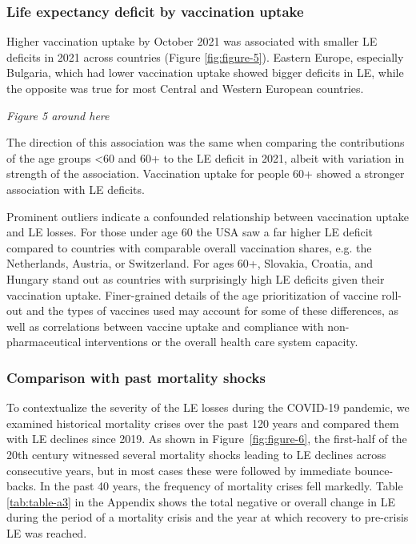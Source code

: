 \documentclass[12pt]{article}
\begin{document}
\subsubsection*{Life expectancy deficit by vaccination uptake}

Higher vaccination uptake by October 2021 was associated with smaller LE deficits in 2021 across countries (Figure \ref{fig:figure-5}). Eastern Europe, especially Bulgaria, which had lower vaccination uptake showed bigger deficits in LE, while the opposite was true for most Central and Western European countries.

\par\medskip
\emph{Figure 5 around here}
\par\medskip

The direction of this association was the same when comparing the contributions of the age groups <60 and 60+ to the LE deficit in 2021, albeit with variation in strength of the association. Vaccination uptake for people 60+ showed a stronger association with LE deficits.

Prominent outliers indicate a confounded relationship between vaccination uptake and LE losses. For those under age 60 the USA saw a far higher LE deficit compared to countries with comparable overall vaccination shares, e.g. the Netherlands, Austria, or Switzerland. For ages 60+, Slovakia, Croatia, and Hungary stand out as countries with surprisingly high LE deficits given their vaccination uptake. Finer-grained details of the age prioritization of vaccine roll-out and the types of vaccines used may account for some of these differences, as well as correlations between vaccine uptake and compliance with non-pharmaceutical interventions or the overall health care system capacity.

\subsubsection*{Comparison with past mortality shocks}

To contextualize the severity of the LE losses during the COVID-19 pandemic, we examined historical mortality crises over the past 120 years and compared them with LE declines since 2019. As shown in Figure~\ref{fig:figure-6}, the first-half of the 20th century witnessed several mortality shocks leading to LE declines across consecutive years, but in most cases these were followed by immediate bounce-backs. In the past 40 years, the frequency of mortality crises fell markedly. Table \ref{tab:table-a3} in the Appendix shows the total negative or overall change in LE during the period of a mortality crisis and the year at which recovery to pre-crisis LE was reached.
\end{document}
